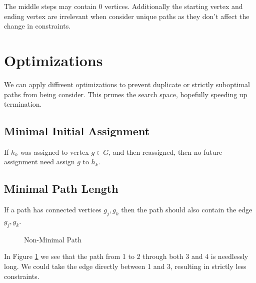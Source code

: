 \documentclass[11pt,twocolumn]{article}
\begin{document}
The middle steps may contain $0$ vertices.
Additionally the starting vertex and ending vertex are irrelevant when consider unique paths as they don't affect the change in
 constraints.
\section{Optimizations}
We can apply diffreent optimizations to prevent duplicate or strictly suboptimal paths from being consider.
This prunes the search space, hopefully speeding up termination.

\subsection{Minimal Initial Assignment}
If $h_k$ was assigned to vertex $g \in G$, and then reassigned, then no future assignment need assign $g$ to $h_k$.
\subsection{Minimal Path Length}
If a path has connected vertices $g_j, g_k$ then the path should also contain the edge $g_j, g_k$.

\begin{figure}[H]
\caption{\label{fig:min path 1.1}Non-Minimal Path}
\end{figure}

In Figure \ref{fig:min path 1.1} we see that the path from 1 to 2 through both 3 and 4 is needlessly long.
We could take the edge directly between 1 and 3, resulting in strictly less constraints.
\end{document}
